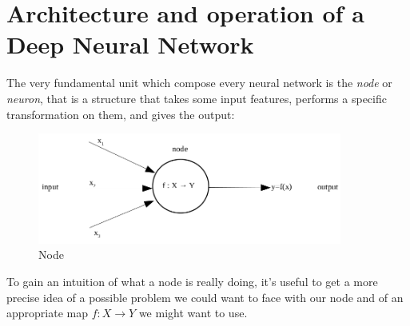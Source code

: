 \documentclass[12pt, a4paper]{report}
\theoremstyle{definition}
\begin{document}
\section{Architecture and operation of a Deep Neural Network}\label{section1.1}
The very fundamental unit which compose every neural network is the \textit{node} or \textit{neuron}, that is a structure that takes some input features, performs a specific transformation on them, and gives the output:
\begin{figure}[H]
\centering
\includegraphics[width=10cm]{img/node}
\caption{Node}\label{fig1}
\end{figure}
\noindent To gain an intuition of what a node is really doing, it's useful to get a more precise idea of a possible problem we could want to face with our node and of an appropriate map $f:X\rightarrow Y$ we might want to use.
\end{document}
